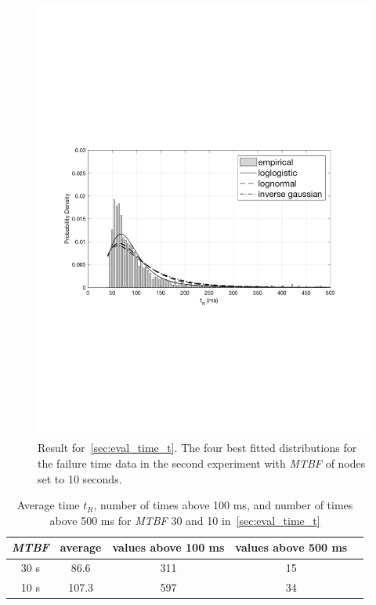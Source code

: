 \documentclass{cslthse-msc}
\begin{document}
\begin{figure}[!hbt]
\centering
\includegraphics[scale=0.5]{images/results/distribution_results_10.pdf} 
\caption[Fitted distributions in~\cref{sec:eval_time_t}, \emph{MTBF} = 10 s]{Result for~\cref{sec:eval_time_t}. The four best fitted distributions for the failure time data in the second experiment with \emph{MTBF} of nodes set to 10 seconds.} \label{fig:distribution_results_10}
\end{figure}

 \begin{table}[hbt!]
	\begin{center}
	\begin{tabular}{| c | c | c | c | c |}
	 \hline
	 \emph{MTBF} & average & values above 100 ms & values above 500 ms \\
	 \hline
	  30 s & 86.6 & 311 & 15\\
	  10 s & 107.3 & 597 & 34\\
	   \hline
	\end{tabular}
	 \caption[Average $t_R$, number of times above 100 ms and 500 ms in~\cref{sec:eval_time_t}]{Average time $t_R$, number of times above 100 ms, and number of times above 500 ms for \emph{MTBF} 30 and 10 in~\cref{sec:eval_time_t}}
	 \label{table:tr}
	 \end{center}
 \end{table} 
\end{document}
